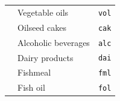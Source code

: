 \begin{center}
\begin{xltabular}{\linewidth}{l l l}
                                & Vegetable oils & \texttt{vol} \\
                                & Oilseed cakes & \texttt{cak} \\
                                & Alcoholic beverages & \texttt{alc} \\
                                & Dairy products & \texttt{dai} \\
                                & Fishmeal & \texttt{fml} \\
                                & Fish oil & \texttt{fol} \\
    \bottomrule
\end{xltabular}
\end{center}
